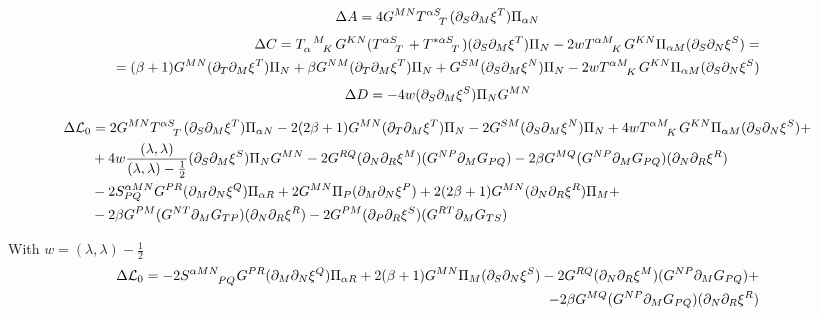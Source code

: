 \documentclass{article}
\begin{document}
\begin{align}
    \Delta A = 4G^{MN}\tensor{T}{^{\alpha S}_T}(\pd_S\pd_M\xi^T)\Pi_{\alpha N}
\end{align}
\begin{align}
    \Delta C = \tensor{T}{_\alpha^M_K}G^{KN}(\tensor{T}{^\alpha^S_T}+\tensor{T}{^{*\alpha S}_T})(\pd_S\pd_M\xi^T)\Pi_N-2w\tensor{T}{^{\alpha}^M_K}G^{KN}\Pi_{\alpha M}(\pd_S\pd_N\xi^S) =\\
    =(\beta+1)G^{MN}(\pd_T\pd_M\xi^T)\Pi_N+\beta G^{NM}(\pd_T\pd_M\xi^T)\Pi_N+G^{SM}(\pd_S\pd_M\xi^N)\Pi_N-2w\tensor{T}{^{\alpha}^M_K}G^{KN}\Pi_{\alpha M}(\pd_S\pd_N\xi^S)
\end{align}
\begin{align}
    \Delta D = -4w(\partial_S\partial_M\xi^S)\Pi_N G^{MN}
\end{align}

\begin{align}
    \Delta \mathcal{L}_0 &= 2G^{MN}\tensor{T}{^{\alpha S}_T}(\pd_S\pd_M\xi^T)\Pi_{\alpha N}-2(2\beta+1)G^{MN}(\pd_T\pd_M\xi^T)\Pi_N-2G^{SM}(\pd_S\pd_M \xi^N)\Pi_N+4w \tensor{T}{^\alpha ^M_K}G^{KN}\Pi_{\alpha M}(\pd_S\pd_N\xi^S)+\\
    &+4w\frac{(\lambda,\lambda)}{(\lambda,\lambda)-\frac{1}{2}}(\pd_S\pd_M\xi^S)\Pi_N G^{MN}-2G^{RQ}(\pd_N\pd_R\xi^M)(G^{NP}\pd_MG_{PQ})-2\beta G^{MQ}(G^{NP}\pd_M G_{PQ})(\pd_N\pd_R\xi^R)\\
    &-2S^{\alpha MN}_{PQ}G^{PR}(\pd_M\pd_N\xi^Q)\Pi_{\alpha R}+2G^{MN}\Pi_P(\pd_M\pd_N\xi^P)+2(2\beta+1)G^{MN}(\pd_N\pd_R\xi^R)\Pi_M+\\
    &-2\beta G^{PM}(G^{NT}\pd_M G_{TP})(\pd_N\pd_R\xi^R)-2G^{PM}(\pd_P\pd_R\xi^S)(G^{RT}\pd_M G_{TS})
\end{align}

With $w=(\lambda,\lambda)-\frac{1}{2}$
\begin{align}
    \Delta \mathcal{L}_0 = -2\tensor{S}{^\alpha^M^N_P_Q}G^{PR}(\pd_M\pd_N\xi^Q)\Pi_{\alpha R}+2(\beta+1)G^{MN}\Pi_M(\pd_S\pd_N\xi^S)-2G^{RQ}(\pd_N\pd_R\xi^M)(G^{NP}\pd_MG_{PQ})+\\
    -2\beta G^{MQ}(G^{NP}\pd_M G_{PQ})(\pd_N\pd_R\xi^R)
\end{align}
\end{document}
